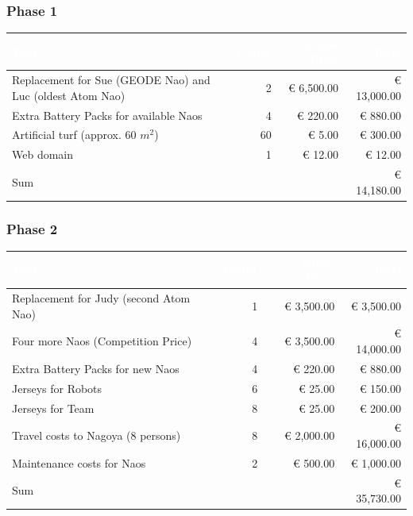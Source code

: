 \documentclass[12pt]{article}
\theoremstyle{definition}
\begin{document}
\subsubsection{Phase 1}
\begin{tabular}{|p{.51\linewidth}|r|r|r|}
\hline
\cellcolor[gray]{0.5}\textcolor{white}{Text} & \cellcolor[gray]{0.45}\textcolor{white}{Count} & \cellcolor[gray]{0.5}\textcolor{white}{Single Price} & \cellcolor[gray]{0.45}\textcolor{white}{Total} \\ \hline
Replacement for Sue (GEODE Nao) and Luc (oldest Atom Nao) & 2 & \euro{} 6,500.00 & \euro{} 13,000.00\\ \hline
Extra Battery Packs for available Naos & 4 & \euro{} 220.00 & \euro{} 880.00 \\ \hline
Artificial turf (approx. 60 $m^2$) & 60 & \euro{} 5.00 & \euro{} 300.00 \\ \hline
Web domain & 1 & \euro{} 12.00 & \euro{} 12.00 \\ \hline
Sum &  &  & \euro{} 14,180.00 \\ \hline
\end{tabular}

\subsubsection{Phase 2}
\begin{tabular}{|p{.51\linewidth}|r|r|r|}
\hline
\cellcolor[gray]{0.5}\textcolor{white}{Text} & \cellcolor[gray]{0.45}\textcolor{white}{Count} & \cellcolor[gray]{0.5}\textcolor{white}{Single Price} & \cellcolor[gray]{0.45}\textcolor{white}{Total} \\ \hline
Replacement for Judy (second Atom Nao) & 1 & \euro{} 3,500.00 & \euro{} 3,500.00\\ \hline
Four more Naos (Competition Price) & 4 & \euro{} 3,500.00 & \euro{} 14,000.00 \\ \hline
Extra Battery Packs for new Naos & 4 & \euro{} 220.00 & \euro{} 880.00 \\ \hline
Jerseys for Robots & 6 & \euro{} 25.00 & \euro{} 150.00 \\ \hline
Jerseys for Team & 8 & \euro{} 25.00 & \euro{} 200.00 \\ \hline
Travel costs to Nagoya (8 persons) & 8 & \euro{} 2,000.00 & \euro{} 16,000.00 \\ \hline
Maintenance costs for Naos & 2 & \euro{} 500.00 & \euro{} 1,000.00 \\ \hline
Sum &  &  & \euro{} 35,730.00 \\ \hline
\end{tabular}

{}
\end{document}
